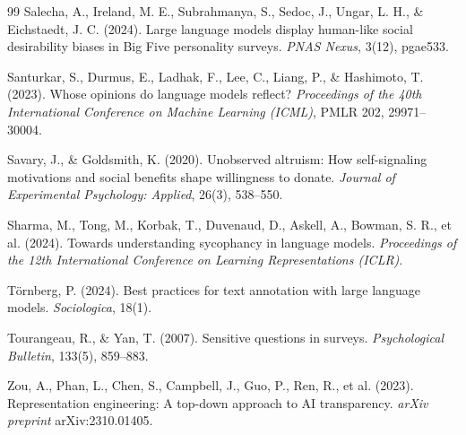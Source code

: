 \documentclass[14pt,a4paper]{extarticle}
\begin{document}
\begin{thebibliography}{99}
Salecha, A., Ireland, M. E., Subrahmanya, S., Sedoc, J., Ungar, L. H., \& Eichstaedt, J. C. (2024). Large language models display human-like social desirability biases in Big Five personality surveys. \textit{PNAS Nexus}, 3(12), pgae533.

Santurkar, S., Durmus, E., Ladhak, F., Lee, C., Liang, P., \& Hashimoto, T. (2023). Whose opinions do language models reflect? \textit{Proceedings of the 40th International Conference on Machine Learning (ICML)}, PMLR 202, 29971--30004.

Savary, J., \& Goldsmith, K. (2020). Unobserved altruism: How self-signaling motivations and social benefits shape willingness to donate. \textit{Journal of Experimental Psychology: Applied}, 26(3), 538--550.

Sharma, M., Tong, M., Korbak, T., Duvenaud, D., Askell, A., Bowman, S. R., et al. (2024). Towards understanding sycophancy in language models. \textit{Proceedings of the 12th International Conference on Learning Representations (ICLR)}.

T\"ornberg, P. (2024). Best practices for text annotation with large language models. \textit{Sociologica}, 18(1).

Tourangeau, R., \& Yan, T. (2007). Sensitive questions in surveys. \textit{Psychological Bulletin}, 133(5), 859--883.

Zou, A., Phan, L., Chen, S., Campbell, J., Guo, P., Ren, R., et al. (2023). Representation engineering: A top-down approach to AI transparency. \textit{arXiv preprint} arXiv:2310.01405.

\end{thebibliography}
\end{document}
